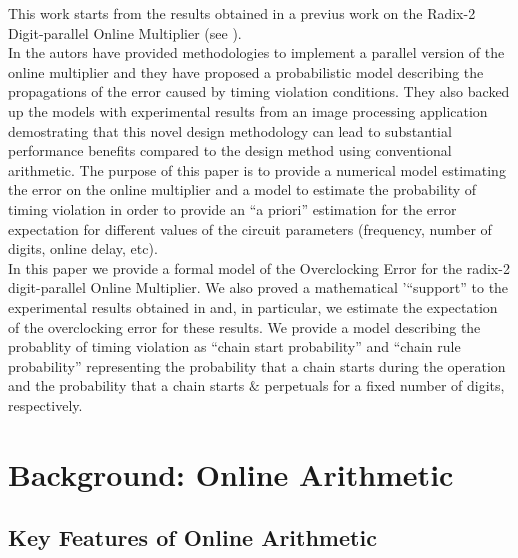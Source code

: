 \documentclass[journal]{IEEEtran}
\begin{document}
This work starts from the results obtained in a previus work on the Radix-2 Digit-parallel Online Multiplier (see \cite{onlinearith}).\\
 In \cite{onlinearith} the autors have provided methodologies to implement a parallel version of the online multiplier and they have proposed a probabilistic model describing the propagations of the error caused by timing violation conditions. They also backed up the models with experimental results from an image processing application demostrating that this novel design methodology can lead to substantial performance benefits compared to the design method using conventional arithmetic. The purpose of this paper is to provide a numerical model estimating the error on the online multiplier and a model to estimate the probability of timing violation in order to provide an ``a priori'' estimation for the error expectation for different values of the circuit parameters (frequency, number of digits, online delay, etc).  \\
In this paper we provide a formal model of the Overclocking Error for the radix-2 digit-parallel Online Multiplier. We also proved a mathematical '``support'' to the experimental results obtained in  \cite{onlinearith} and, in particular, we estimate the expectation of the overclocking error for these results. We provide a model describing the probablity of timing violation as ``chain start probability'' and ``chain rule probability'' representing the probability that a chain starts during the operation and the probability that a chain starts $\&$ perpetuals for a fixed number of digits, respectively.  \\














\section{Background: Online Arithmetic}\label{Sec:Background}
\subsection{Key Features of Online Arithmetic}
\end{document}
